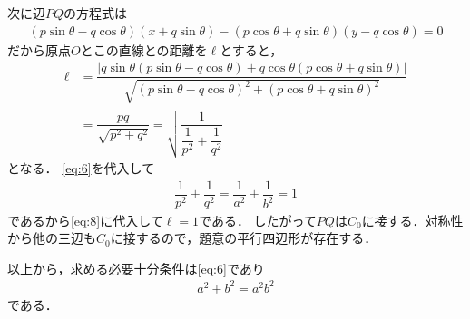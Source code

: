 \documentclass[../../main.tex]{subfiles}
\begin{document}
次に辺$PQ$の方程式は
\begin{align}
  (p\sin\theta-q\cos\theta)(x+q\sin\theta)-(p\cos\theta+q\sin\theta)(y-q\cos\theta)=0
\end{align}
だから原点$O$とこの直線との距離を$\ell$とすると，
\begin{align}
  \ell
  &=\dfrac{|q\sin\theta(p\sin\theta-q\cos\theta)+q\cos\theta(p\cos\theta+q\sin\theta)|}{\sqrt{(p\sin\theta-q\cos\theta)^2+(p\cos\theta+q\sin\theta)^2}}\\
  &=\dfrac{pq}{\sqrt{p^2+q^2}}
  =\sqrt{\dfrac{1}{\dfrac{1}{p^2}+\dfrac{1}{q^2}}} \label{eq:8}
\end{align}
となる．
\cref{eq:6}を代入して
\begin{align}
  \dfrac{1}{p^2}+\dfrac{1}{q^2}
  =\dfrac{1}{a^2}+\dfrac{1}{b^2}=1
\end{align}
であるから\cref{eq:8}に代入して$\ell=1$である．
したがって$PQ$は$C_0$に接する．対称性から他の三辺も$C_0$に接するので，題意の平行四辺形が存在する．

以上から，求める必要十分条件は\cref{eq:6}であり
\begin{align}
  a^2+b^2=a^2b^2
\end{align}
である．

\end{document}
